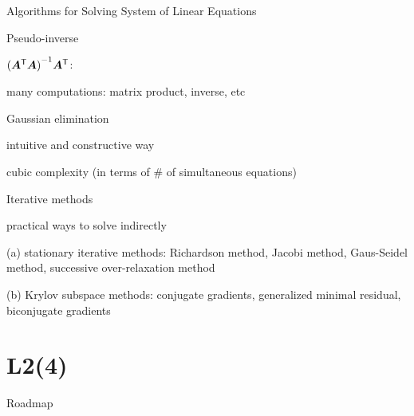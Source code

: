 \documentclass[handout,fleqn,aspectratio=169]{beamer}
\begin{document}
\begin{frame}{Algorithms for Solving System of Linear Equations} 

\plitemsep 0.05in

\bce
\item Pseudo-inverse
\vspace{-0.6cm}
\bci
\item ${({\bm{A}}^{\mathsf{T}} \bm{A})}^{-1} {\bm{A}}^{\mathsf{T}}$: 
\item many computations: matrix product, inverse, etc
\eci

\item Gaussian elimination
\bci
\item intuitive and constructive way
\item cubic complexity (in terms of \# of simultaneous equations)
\eci

\item Iterative methods
\bci
\item practical ways to solve indirectly

\item[(a)] stationary iterative methods: Richardson method, Jacobi method, Gaus-Seidel method, successive over-relaxation method
\item[(b)] Krylov subspace methods: conjugate gradients, generalized minimal residual, biconjugate gradients  
\eci

\ece
\end{frame}


\section{L2(4)}
\begin{frame}{Roadmap}

\plitemsep 0.1in

\bce[(1)] 
\item {}

\item {}

\item {}
\ece
\end{frame}
\end{document}
